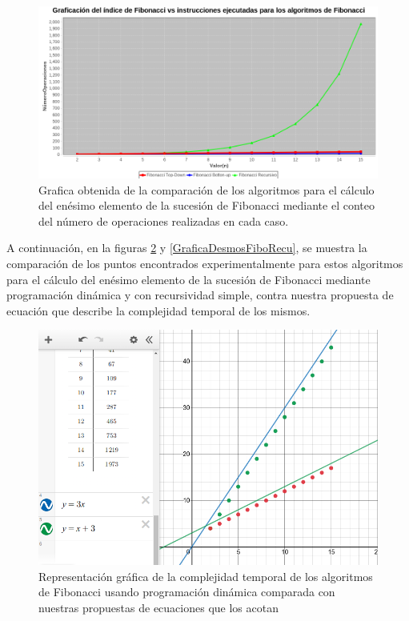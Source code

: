     \begin{figure}[h!]
        \centering
        \includegraphics[width=18cm]{Fibonacci/fibo-din-graph.png}
        \caption{Grafica obtenida de la comparación de los algoritmos para el cálculo del enésimo elemento de la sucesión de Fibonacci mediante el conteo del número de operaciones realizadas en cada caso.}
        \label{GraficaFibonacci}
    \end{figure}
    \newpage
    A continuación, en la figuras \ref{GraficaDesmosFiboDinamico} y \ref{GraficaDesmosFiboRecu}, se muestra la comparación de los puntos encontrados experimentalmente para estos algoritmos para el cálculo del enésimo elemento de la sucesión de Fibonacci mediante programación dinámica y con recursividad simple, contra nuestra propuesta de ecuación que describe la complejidad temporal de los mismos.
    
    \begin{figure}[h!]
        \centering
        \includegraphics[width=18cm]{Fibonacci/fibo-graph-desm1.png}
        \caption{Representación gráfica de la complejidad temporal de los algoritmos de Fibonacci usando programación dinámica comparada con nuestras propuestas de ecuaciones que los acotan}
        \label{GraficaDesmosFiboDinamico}
    \end{figure}
    
